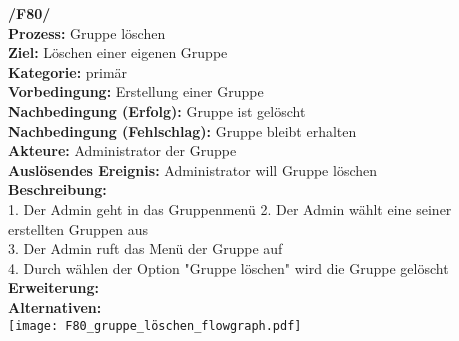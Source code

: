 \textbf{/F80/} \\
\textbf{Prozess:} Gruppe löschen \\
\textbf{Ziel:} Löschen einer eigenen Gruppe \\
\textbf{Kategorie:} primär \\
\textbf{Vorbedingung:} Erstellung einer Gruppe \\
\textbf{Nachbedingung (Erfolg):} Gruppe ist gelöscht\\
\textbf{Nachbedingung (Fehlschlag):} Gruppe bleibt erhalten\\
\textbf{Akteure:} Administrator der Gruppe \\
\textbf{Auslösendes Ereignis:} Administrator will Gruppe löschen\\
\textbf{Beschreibung:} \\
1. Der Admin geht in das Gruppenmenü
2. Der Admin wählt eine seiner erstellten Gruppen aus \\
3. Der Admin ruft das Menü der Gruppe auf \\
4. Durch wählen der Option "Gruppe löschen" wird die Gruppe gelöscht \\
\textbf{Erweiterung:} \\
\textbf{Alternativen:} \\

\texttt{[image: F80\_gruppe\_löschen\_flowgraph.pdf]}
